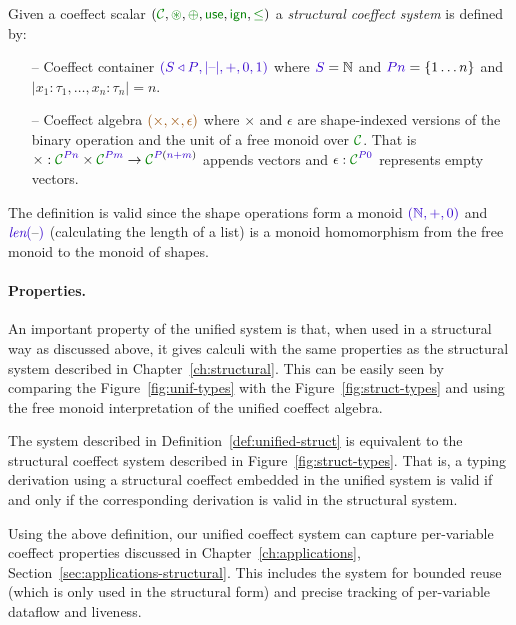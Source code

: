 \begin{definition}
\label{def:unified-struct}
Given a coeffect scalar $(\C, \cseq, \cpar, \cunit, \czero, \cleq)$ a \emph{structural coeffect system} 
is defined by: 

\begin{itemize}{}
\item[--] Coeffect container $\sclrd{(\SHP, {|}\textnormal{--}{|}, +, 0, 1)}$ where $\SH=\mathbb{N}$ and
  $\SP \sclrd{n}=\{ 1 \ldots n \}$ and  ${|}x_1\!:\!\tau_1,\ldots,x_n\!:\!\tau_n{|}=n$.

\item[--] Coeffect algebra $\aclrd{(\times, \times, \epsilon)}$ where $\times$ and $\epsilon$ are
  shape-indexed versions of the binary operation and the unit of a free monoid over $\C$.
  That is $\times : \C^{\SP\sclrd{n}} \times \C^{\SP\sclrd{m}} \rightarrow \C^{\SP(\sclrd{n + m})}$ 
  appends vectors and $\epsilon : \C^{\SP\sclrd{0}}$ represents empty vectors.
\end{itemize}
\end{definition}

\noindent
The definition is valid since the shape operations form a monoid
$\sclrd{(\mathbb{N}, +, 0)}$ and $\slen{\textnormal{--}}$ (calculating the length of
a list) is a monoid homomorphism from the free monoid to the monoid of
shapes.

\paragraph{Properties.}
An important property of the unified system is that, when used in a structural way as discussed
above, it gives calculi with the same properties as the structural system described in 
Chapter~\ref{ch:structural}. This can be easily seen by comparing the Figure~\ref{fig:unif-types}
with the Figure~\ref{fig:struct-types} and using the free monoid interpretation of the unified
coeffect algebra.

\begin{remark}
The system described in Definition~\ref{def:unified-struct} is equivalent to the structural coeffect
system described in Figure~\ref{fig:struct-types}. That is, a typing derivation using a structural
coeffect embedded in the unified system is valid if and only if the corresponding derivation is
valid in the structural system.
\end{remark}

\noindent
Using the above definition, our unified coeffect system can capture per-variable coeffect properties
discussed in Chapter~\ref{ch:applications}, Section~\ref{sec:applications-structural}. This includes
the system for bounded reuse (which is only used in the structural form) and precise tracking 
of per-variable dataflow and liveness. 

